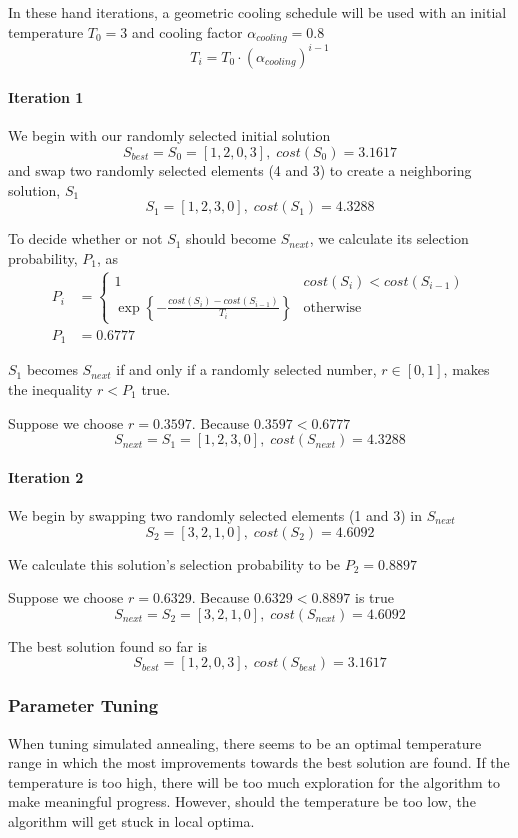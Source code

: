 \documentclass[a4paper]{article}
\newcommand{\subsubsubsection}[1]{\paragraph{#1} \mbox{}}
\begin{document}
In these hand iterations, a geometric cooling schedule will be used with an initial temperature $T_0 = 3$ and cooling factor $\alpha_\mathit{cooling} = 0.8$
$$T_i = T_0 \cdot \left( \alpha_\mathit{cooling} \right)^{i - 1}$$

\subsubsubsection{Iteration 1}

We begin with our randomly selected initial solution
$$S_\mathit{best} = S_0 = [ 1, 2, 0, 3 ], \; \mathit{cost}(S_0) = 3.1617$$
and swap two randomly selected elements (4 and 3) to create a neighboring
solution, $S_1$
$$S_1 = [ 1, 2, 3, 0 ], \; \mathit{cost}(S_1) = 4.3288$$

To decide whether or not $S_1$ should become $S_\mathit{next}$, we calculate its
selection probability, $P_1$, as
\begin{align*}
P_i & =
\begin{cases}
  1 & \mathit{cost}(S_{i}) < \mathit{cost}(S_{i - 1}) \\
  \exp \left\{-\frac{\mathit{cost}(S_{i}) - \mathit{cost}(S_{i - 1})}{T_i}\right\} & \text{otherwise}
\end{cases} \\
P_1 & = 0.6777
\end{align*}

$S_1$ becomes $S_\mathit{next}$ if and only if a randomly selected number,
$r \in [0, 1]$, makes the inequality $r < P_1$ true.

Suppose we choose $r = 0.3597$. Because $0.3597 < 0.6777$
$$S_\mathit{next} = S_1 = [ 1, 2, 3, 0 ], \; \mathit{cost}(S_\mathit{next}) = 4.3288$$

\subsubsubsection{Iteration 2}

We begin by swapping two randomly selected elements (1 and 3) in $S_\mathit{next}$
$$S_2 = [ 3, 2, 1, 0 ], \; \mathit{cost}(S_2) = 4.6092$$

We calculate this solution's selection probability to be $P_2 = 0.8897$

Suppose we choose $r = 0.6329$. Because $0.6329 < 0.8897$ is true
$$S_\mathit{next} = S_2 = [ 3, 2, 1, 0 ], \; \mathit{cost}(S_\mathit{next}) = 4.6092$$

The best solution found so far is
$$S_\mathit{best} = [ 1, 2, 0, 3 ], \; \mathit{cost}(S_\mathit{best}) = 3.1617$$

\subsubsection{Parameter Tuning}

When tuning simulated annealing, there seems to be an optimal temperature range in which the most improvements towards the best solution are found. If the temperature is too high, there will be too much exploration for the algorithm to make meaningful progress. However, should the temperature be too low, the algorithm will get stuck in local optima.
\end{document}
